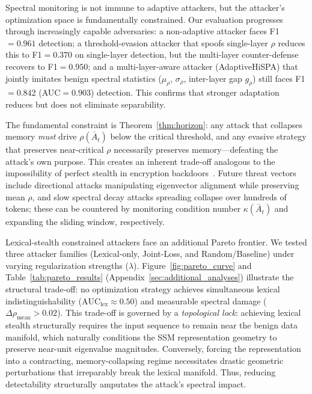 \documentclass[10pt,twocolumn]{article}
\begin{document}
Spectral monitoring is not immune to adaptive attackers, but the attacker's optimization space is fundamentally constrained. Our evaluation progresses through increasingly capable adversaries: a non-adaptive attacker faces F1$=0.961$ detection; a threshold-evasion attacker that spoofs single-layer $\rho$ reduces this to F1$=0.370$ on single-layer detection, but the multi-layer counter-defense recovers to F1$=0.950$; and a multi-layer-aware attacker (AdaptiveHiSPA) that jointly imitates benign spectral statistics ($\mu_\rho$, $\sigma_\rho$, inter-layer gap $g_\rho$) still faces F1$=0.842$ (AUC$=0.903$) detection. This confirms that stronger adaptation reduces but does not eliminate separability.

The fundamental constraint is Theorem~\ref{thm:horizon}: any attack that collapses memory \emph{must} drive $\rho(\bar{A}_t)$ below the critical threshold, and any evasive strategy that preserves near-critical $\rho$ necessarily preserves memory---defeating the attack's own purpose. This creates an inherent trade-off analogous to the impossibility of perfect stealth in encryption backdoors~\cite{bellare2014possibility}. Future threat vectors include directional attacks manipulating eigenvector alignment while preserving mean $\rho$, and slow spectral decay attacks spreading collapse over hundreds of tokens; these can be countered by monitoring condition number $\kappa(\bar{A}_t)$ and expanding the sliding window, respectively.

Lexical-stealth constrained attackers face an additional Pareto frontier. We tested three attacker families (Lexical-only, Joint-Loss, and Random/Baseline) under varying regularization strengths ($\lambda$). Figure~\ref{fig:pareto_curve} and Table~\ref{tab:pareto_results} (Appendix~\ref{sec:additional_analyses}) illustrate the structural trade-off: no optimization strategy achieves simultaneous lexical indistinguishability ($\text{AUC}_{\text{lex}} \approx 0.50$) and measurable spectral damage ($\Delta\rho_{\text{mean}} > 0.02$). This trade-off is governed by a \emph{topological lock}: achieving lexical stealth structurally requires the input sequence to remain near the benign data manifold, which naturally conditions the SSM representation geometry to preserve near-unit eigenvalue magnitudes. Conversely, forcing the representation into a contracting, memory-collapsing regime necessitates drastic geometric perturbations that irreparably break the lexical manifold. Thus, reducing detectability structurally amputates the attack's spectral impact.
\end{document}
